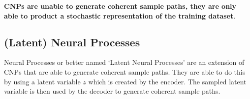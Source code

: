 \documentclass[main.tex]{subfiles}
\begin{document}
\textbf{CNPs are unable to generate coherent sample paths, they are only able to product a stochastic representation of the training dataset}. 

\subsection{(Latent) Neural Processes}

Neural Processes or better named `Latent Neural Processes' are an extension of CNPs that are able to generate coherent sample paths. They are able to do this by using a latent variable $z$ which is created by the encoder. The sampled latent variable is then used by the decoder to generate coherent sample paths.


\ifSubfilesClassLoaded{%
    \printbibliography{}
}{} 
\end{document}
